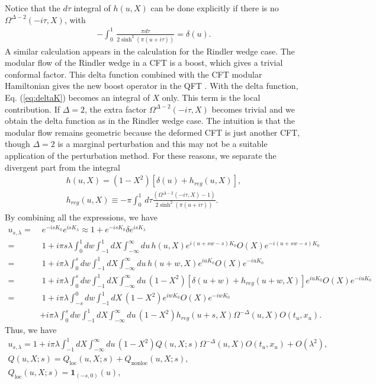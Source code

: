 \documentclass[a4paper,11pt]{article}
\theoremstyle{definition}
\theoremstyle{remark}
\begin{document}
Notice that the $d\tau$ integral of $h(u,X)$ can be done explicitly if there is no $\Omega^{\Delta-2}(-i\tau,X)$, with
\begin{align}
    -\int_0^1\, \frac{ \pi d\tau }{2\sinh^2(\pi (u+i\tau))} = \delta(u).
\end{align}
A similar calculation appears in the calculation for the Rindler wedge case. The modular flow of the Rindler wedge in a CFT is a boost, which gives a trivial conformal factor. This delta function combined with the CFT modular Hamiltonian gives the new boost operator in the QFT \cite{}. With the delta function, Eq. (\ref{eq:deltaK}) becomes an integral of $X$ only. This term is the local contribution.  If $\Delta = 2$, the extra factor $\Omega^{\Delta-2}(-i\tau,X)$ becomes trivial and we obtain the delta function as in the Rindler wedge case. The intuition is that the modular flow remains geometric because the deformed CFT is just another CFT, though $\Delta = 2$ is a marginal perturbation and this may not be a suitable application of the perturbation method. For these reasons, we separate the divergent part from the integral
\begin{gather}
    h(u,X) =  (1-X^2)\left[\delta(u) + h_{reg}(u,X)\right], \\
    h_{reg}(u,X) \equiv -\pi\int_0^1\, d\tau \frac{ (\Omega^{\Delta-2}(-i\tau,X) -1)}{2\sinh^2(\pi (u+i\tau))} .
\end{gather}
By combining all the expressions, we have
\begin{align}
    u_{s,\lambda} =&\; e^{-isK_0}e^{isK_\lambda} \approx 1 + e^{-isK_0}\delta e^{isK_\lambda}\\
    =&\; 1 + i\pi s\lambda\int_0^1 dw  \int_{-1}^1 dX \int_{-\infty}^{\infty} du \, h(u,X) e^{i(u+sw-s)K_0} O(X) e^{-i(u+sw-s)K_0} \\
    =&\; 1 + i\pi \lambda\int_0^s dw  \int_{-1}^1 dX \int_{-\infty}^{\infty} du \, h(u+w,X) e^{iuK_0} O(X) e^{-iuK_0} \\
    =&\; 1 + i\pi \lambda\int_0^s dw  \int_{-1}^1 dX \int_{-\infty}^{\infty} du \, (1-X^2)\left[\delta(u+w) + h_{reg}(u+w,X)\right] e^{iuK_0} O(X) e^{-iuK_0}\\
    =&\; 1 + i\pi \lambda\int_{-s}^0 dw  \int_{-1}^1 dX \, (1-X^2)e^{iwK_0} O(X) e^{-iwK_0} \nonumber\\
    &+ {i\pi \lambda}\int_0^s dw  \int_{-1}^1 dX \int_{-\infty}^{\infty} du \, (1-X^2)h_{reg}(u+s,X) \Omega^{-\Delta}(u,X)O(t_u,x_u).
\end{align}
Thus, we have
\begin{gather}
    u_{s,\lambda} = 1 + i\pi \lambda \int_{-1}^1 dX \int_{-\infty}^{\infty} du \, (1-X^2) Q(u,X;s) \Omega^{-\Delta}(u,X) O(t_u,x_u) +O(\lambda^2),\\
    Q(u,X;s) = Q_{\text{loc}}(u,X;s) + Q_{\text{nonloc}}(u,X;s),\\
    Q_{\text{loc}}(u,X;s) =  \textbf{1}_{(-s,0)}(u),
\end{gather}
\end{document}

